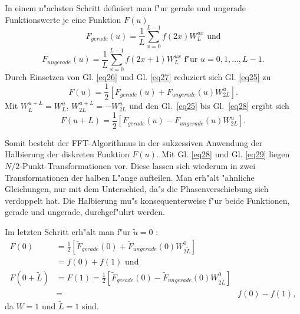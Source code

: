 In einem  n"achsten Schritt definiert man f"ur gerade und ungerade
Funk\-tions\-werte je eine Funktion $F(u)$
\begin{equation} 
\label{eq26}
F_{gerade}(u) = \frac{1}{L} \sum \limits_{x=0}^{L-1}f(2x) W_{L}^{ux} 
\textrm{ und}
\end{equation}
\begin{equation} 
\label{eq27}
F_{ungerade}(u) = \frac{1}{L} \sum \limits_{x=0}^{L-1}f(2x+1) W_{L}^{ux}
\textrm{ f"ur $u=0,1,\dots,L-1$.}
\end{equation}
Durch  Einsetzen  von Gl. \ref{eq26} und Gl. \ref{eq27}  reduziert  sich
Gl. \ref{eq25} zu
\begin{equation}
\label{eq28}
F(u) = \frac{1}{2} \left [ F_{gerade}(u) + F_{ungerade}(u) W_{2L}^{u} \right ]
\textrm{.}
\end{equation}
Mit $W_{L}^{u+L} = W_{L}^{u}$, $W_{2L}^{u+L} = -W_{2L}^{u}$ und den Gl.~\ref{eq25}
bis Gl.~\ref{eq28} ergibt sich
\begin{equation}
\label{eq29}
F(u+L) = \frac{1}{2} \left [ F_{gerade}(u) - F_{ungerade}(u) W_{2L}^{u} \right ]
\textrm{.}
\end{equation}

Somit  besteht  der  FFT-Algorithmus  in  der  sukzessiven
Anwendung  der Halbierung der diskreten Funktion $F(u)$.  Mit
Gl.  \ref{eq28} und Gl. \ref{eq29} liegen $N/2$-Punkt-Transformationen vor.
Diese  lassen  sich  wiederum in zwei Transformationen  der
halben  L"ange  aufteilen. Man erh"alt "ahnliche  Gleichungen,
nur  mit  dem Unterschied, da"s die Phasenverschiebung  sich
verdoppelt  hat.  Die  Halbierung mu"s konsequenterweise  f"ur  beide
Funktionen, gerade und ungerade, durchgef"uhrt werden.

Im letzten Schritt erh"alt man f"ur $\tilde{u}=0$ :
\begin{align}
F(0) &= \frac{1}{2} \left [ \tilde{F}_{gerade}(0) + \tilde{F}_{ungerade}(0)
         W_{2\tilde{L}}^{0} \right ] \nonumber \\
     &= f(0)+f(1)
\textrm{ und }\\
F(0+\tilde{L}) &= F(1) = \frac{1}{2} \left [ \tilde{F}_{gerade}(0) - 
         \tilde{F}_{ungerade}(0) W_{2\tilde{L}}^{0} \right ] \nonumber \\
     &=& f(0)-f(1),
\end{align}
da $W=1$ und $\tilde{L}=1$ sind.

